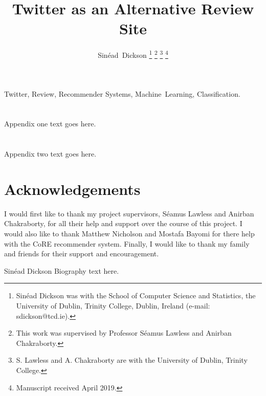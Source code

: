 \documentclass[journal]{IEEEtran}
\begin{document}
\title{Twitter as an Alternative Review Site}

\author{Sin\'ead~Dickson
\thanks{Sin\'ead Dickson was with the School of Computer Science and Statistics, the University of Dublin, Trinity College, Dublin, Ireland (e-mail: sdickson@tcd.ie).}
\thanks{This work was supervised by Professor S\'eamus Lawless and Anirban Chakraborty.}
\thanks{S. Lawless and A. Chakraborty are with the University of Dublin, Trinity College.}%
\thanks{Manuscript received April 2019.}}

\maketitle



\begin{IEEEkeywords}
Twitter, Review, Recommender Systems, Machine~Learning, Classification.
\end{IEEEkeywords}







\appendices
\section{}
Appendix one text goes here.

\section{}
Appendix two text goes here.

\section*{Acknowledgements}
I would first like to thank my project supervisors, S\'eamus Lawless and Anirban Chakraborty, for all their help and support over the course of this project. 
I would also like to thank Matthew Nicholson and Mostafa Bayomi for there help with the CoRE recommender system.
Finally, I would like to thank my family and friends for their support and encouragement.


\begin{IEEEbiography}{Sin\'ead Dickson}
Biography text here.
\end{IEEEbiography}
\end{document}
